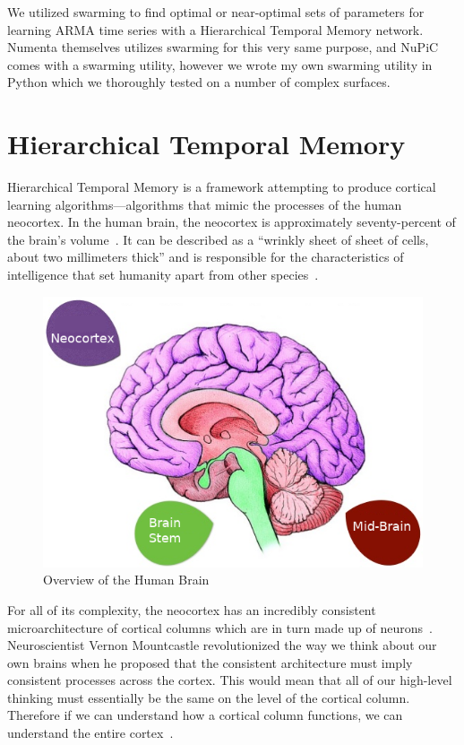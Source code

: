\documentclass[oneside,12pt,openany]{book}
\begin{document}
	We utilized swarming to find optimal or near-optimal sets of parameters for learning ARMA time series with a Hierarchical Temporal Memory network. Numenta themselves utilizes swarming for this very same purpose, and NuPiC comes with a swarming utility, however we wrote my own swarming utility in Python which we thoroughly tested on a number of complex surfaces.
	
	\section{Hierarchical Temporal Memory}
	
	Hierarchical Temporal Memory is a framework attempting to produce cortical learning algorithms---algorithms that mimic the processes of the human neocortex. In the human brain, the neocortex is approximately seventy-percent of the brain's volume~\cite{DiscoveriesBrainWorks}. It can be described as a ``wrinkly sheet of sheet of cells, about two millimeters thick'' and is responsible for the characteristics of intelligence that set humanity apart from other species~\cite{DiscoveriesBrainWorks}. 
	
	\begin{figure}[hbt!]
		\centering
		\includegraphics[width=.5\linewidth]{images/Brain.png}
		\caption{Overview of the Human Brain}
		\label{fig:brain}
	\end{figure}
	
	For all of its complexity, the neocortex has an incredibly consistent microarchitecture of cortical columns which are in turn made up of neurons~\cite{DiscoveriesBrainWorks}. Neuroscientist Vernon Mountcastle revolutionized the way we think about our own brains when he proposed that the consistent architecture must imply consistent processes across the cortex. This would mean that all of our high-level thinking must essentially be the same on the level of the cortical column. Therefore if we can understand how a cortical column functions, we can understand the entire cortex~\cite{DiscoveriesBrainWorks}.	
	
\end{document}
